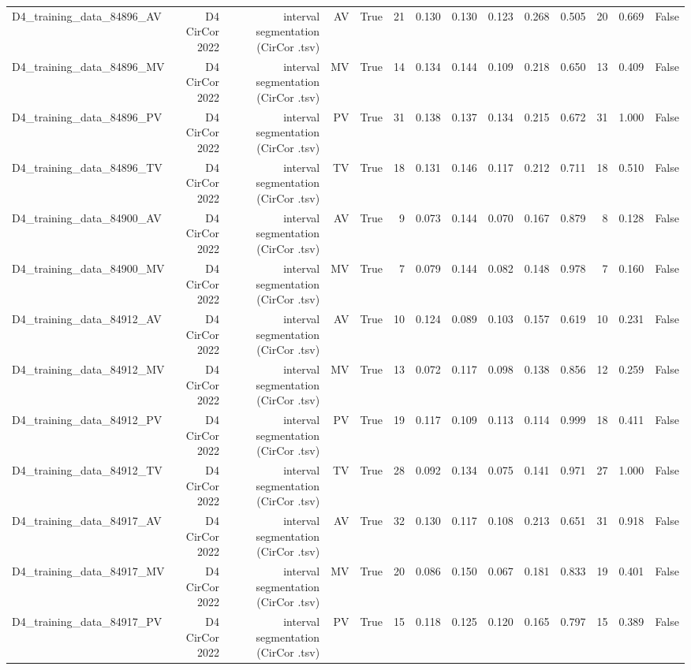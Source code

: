 \begin{table}[htbp]
\begin{tabular}{lrrrrrrrrrrrrr}
    D4\_training\_data\_84896\_AV & D4 CirCor 2022 & interval segmentation (CirCor .tsv) & AV & True & 21 & 0.130 & 0.130 & 0.123 & 0.268 & 0.505 & 20 & 0.669 & False \\
    D4\_training\_data\_84896\_MV & D4 CirCor 2022 & interval segmentation (CirCor .tsv) & MV & True & 14 & 0.134 & 0.144 & 0.109 & 0.218 & 0.650 & 13 & 0.409 & False \\
    D4\_training\_data\_84896\_PV & D4 CirCor 2022 & interval segmentation (CirCor .tsv) & PV & True & 31 & 0.138 & 0.137 & 0.134 & 0.215 & 0.672 & 31 & 1.000 & False \\
    D4\_training\_data\_84896\_TV & D4 CirCor 2022 & interval segmentation (CirCor .tsv) & TV & True & 18 & 0.131 & 0.146 & 0.117 & 0.212 & 0.711 & 18 & 0.510 & False \\
    D4\_training\_data\_84900\_AV & D4 CirCor 2022 & interval segmentation (CirCor .tsv) & AV & True & 9 & 0.073 & 0.144 & 0.070 & 0.167 & 0.879 & 8 & 0.128 & False \\
    D4\_training\_data\_84900\_MV & D4 CirCor 2022 & interval segmentation (CirCor .tsv) & MV & True & 7 & 0.079 & 0.144 & 0.082 & 0.148 & 0.978 & 7 & 0.160 & False \\
    D4\_training\_data\_84912\_AV & D4 CirCor 2022 & interval segmentation (CirCor .tsv) & AV & True & 10 & 0.124 & 0.089 & 0.103 & 0.157 & 0.619 & 10 & 0.231 & False \\
    D4\_training\_data\_84912\_MV & D4 CirCor 2022 & interval segmentation (CirCor .tsv) & MV & True & 13 & 0.072 & 0.117 & 0.098 & 0.138 & 0.856 & 12 & 0.259 & False \\
    D4\_training\_data\_84912\_PV & D4 CirCor 2022 & interval segmentation (CirCor .tsv) & PV & True & 19 & 0.117 & 0.109 & 0.113 & 0.114 & 0.999 & 18 & 0.411 & False \\
    D4\_training\_data\_84912\_TV & D4 CirCor 2022 & interval segmentation (CirCor .tsv) & TV & True & 28 & 0.092 & 0.134 & 0.075 & 0.141 & 0.971 & 27 & 1.000 & False \\
    D4\_training\_data\_84917\_AV & D4 CirCor 2022 & interval segmentation (CirCor .tsv) & AV & True & 32 & 0.130 & 0.117 & 0.108 & 0.213 & 0.651 & 31 & 0.918 & False \\
    D4\_training\_data\_84917\_MV & D4 CirCor 2022 & interval segmentation (CirCor .tsv) & MV & True & 20 & 0.086 & 0.150 & 0.067 & 0.181 & 0.833 & 19 & 0.401 & False \\
    D4\_training\_data\_84917\_PV & D4 CirCor 2022 & interval segmentation (CirCor .tsv) & PV & True & 15 & 0.118 & 0.125 & 0.120 & 0.165 & 0.797 & 15 & 0.389 & False \\

\end{tabular}
\end{table}
